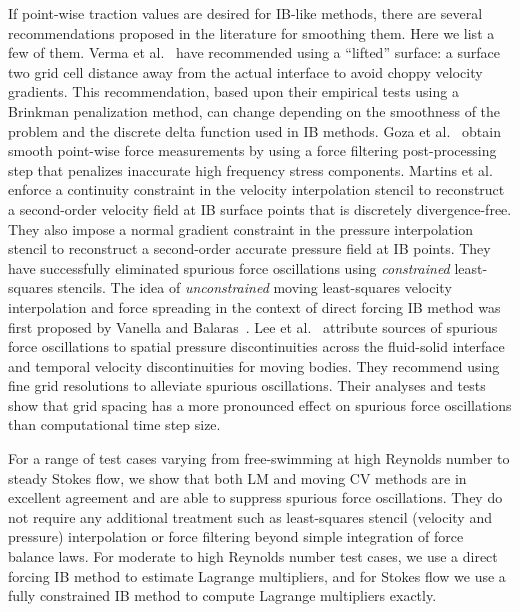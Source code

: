 \documentclass[review]{elsarticle}
\newcommand{\REVIEW}[1]{{#1}}
\begin{document}
If point-wise traction values are desired for IB-like methods, there are several 
recommendations proposed in the literature for smoothing them. Here we 
list a few of them. Verma et al.~\cite{Verma17} have recommended 
using a ``lifted'' surface: a surface two grid cell distance away from the 
actual interface to avoid choppy velocity gradients. This recommendation, 
based upon their empirical tests using a Brinkman penalization method, can 
change depending on the smoothness of the problem and the discrete delta 
function used in IB methods. Goza et al.~\cite{Goza16} obtain smooth point-wise force measurements
by using a force filtering post-processing step that penalizes inaccurate high frequency stress components.
Martins et al.~\cite{Martins17} enforce a continuity 
constraint in the velocity interpolation stencil to reconstruct a
second-order velocity field at IB surface points that is discretely divergence-free. 
They also impose a normal gradient constraint in the pressure 
interpolation stencil to reconstruct a second-order accurate pressure field 
at IB points. They have successfully eliminated spurious force 
oscillations using \emph{constrained} least-squares stencils. The idea 
of \emph{unconstrained} moving least-squares velocity interpolation and force  
spreading in the context of direct forcing IB method was first proposed by 
Vanella and Balaras~\cite{Vanella09}. Lee et al.~\cite{Lee11} attribute sources 
of spurious force oscillations to spatial pressure discontinuities across the
fluid-solid interface and temporal velocity discontinuities for moving bodies.
They recommend using fine grid resolutions to alleviate spurious oscillations.
\REVIEW{Their analyses and tests~\cite{Lee11} show that grid spacing has 
a more pronounced effect on spurious force oscillations than computational time 
step size.}

For a range of test cases varying from free-swimming at high Reynolds 
number to steady Stokes flow, we show that both LM and moving CV methods 
are in excellent agreement and are able to suppress spurious force 
oscillations. They do not require any additional treatment such as least-squares 
stencil (velocity and pressure) interpolation or force filtering beyond simple 
integration of force balance laws. For moderate to high Reynolds number 
test cases, we use a direct forcing IB method to estimate Lagrange multipliers, 
and for Stokes flow we use a fully constrained IB method 
to compute Lagrange multipliers exactly. 
\end{document}
